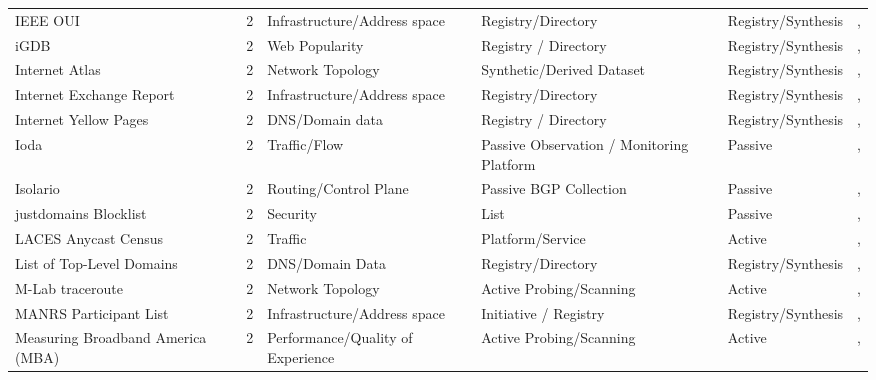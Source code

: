 \documentclass[11pt,a4paper]{article}
\begin{document}
\begin{longtable}{@{}p{}p{}p{}p{}p{}p{}p{}@{}}
IEEE OUI & \cite{ieee-oui-db} & 2 & Infrastructure/Address space & Registry/Directory & Registry/Synthesis & \cite{10.1145/3487552.3487829}, \cite{10.1007/978-3-031-56249-5_5} \\
iGDB & \cite{igdb} & 2 & Web Popularity & Registry / Directory & Registry/Synthesis & \cite{10.1145/3646547.3688429}, \cite{10.1145/3777912.3809135} \\
Internet Atlas & \cite{internet_atlas} & 2 & Network Topology & Synthetic/Derived Dataset & Registry/Synthesis & \cite{10.1145/3517745.3561443}, \cite{10.1007/978-3-030-72582-2_15} \\
Internet Exchange Report & \cite{he_ix_report} & 2 & Infrastructure/Address space & Registry/Directory & Registry/Synthesis & \cite{10.1145/3517745.3561443}, \cite{10.1007/978-3-030-98785-5_16} \\
Internet Yellow Pages & \cite{10.1145/3646547.3688444} & 2 & DNS/Domain data & Registry / Directory & Registry/Synthesis & \cite{10.1007/978-3-031-85960-1_13}, \cite{10.1145/3777912.3809141} \\
Ioda & \cite{ioda} & 2 & Traffic/Flow & Passive Observation / Monitoring Platform & Passive & \cite{10.1007/978-3-031-85960-1_13}, \cite{10.1145/3777912.3809143} \\
Isolario & \cite{isolario_project} & 2 & Routing/Control Plane & Passive BGP Collection & Passive & \cite{10.1145/3487552.3487865}, \cite{10.1007/978-3-030-98785-5_10} \\
justdomains Blocklist & \cite{justdomains_blocklist} & 2 & Security & List & Passive & \cite{10.1007/978-3-031-28486-1_26}, \cite{10.1007/978-3-031-85960-1_8} \\
LACES Anycast Census & \cite{10.1145/3730567.3764484} & 2 & Traffic & Platform/Service & Active & \cite{10.1145/3777912.3839831}, \cite{10.1145/3777912.3839828} \\
List of Top-Level Domains & \cite{icann_tlds} & 2 & DNS/Domain Data & Registry/Directory & Registry/Synthesis & \cite{10.1007/978-3-031-28486-1_22}, \cite{10.1007/978-3-031-56249-5_9} \\
M-Lab traceroute & \cite{mlab_traceroute} & 2 & Network Topology & Active Probing/Scanning & Active & \cite{10.1145/3618257.3624809}, \cite{10.1145/3517745.3561449} \\
MANRS Participant List & \cite{manrs} & 2 & Infrastructure/Address space & Initiative / Registry & Registry/Synthesis & \cite{10.1007/978-3-030-98785-5_14}, \cite{10.1145/3517745.3561419} \\
Measuring Broadband America (MBA) & \cite{measuring_broadband_america} & 2 & Performance/Quality of Experience & Active Probing/Scanning & Active & \cite{10.1145/3517745.3561441}, \cite{10.1007/978-3-030-72582-2_2} \\

\end{longtable}
\end{document}
